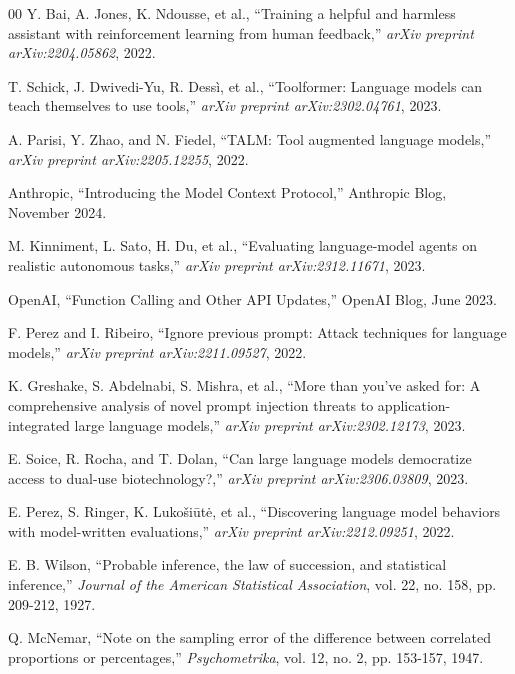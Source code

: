 \documentclass[compsoc,conference,a4paper,10pt,times]{IEEEtran}
\begin{document}
\begin{thebibliography}{00}
 Y. Bai, A. Jones, K. Ndousse, et al., ``Training a helpful and harmless assistant with reinforcement learning from human feedback,'' \emph{arXiv preprint arXiv:2204.05862}, 2022.

 T. Schick, J. Dwivedi-Yu, R. Dessì, et al., ``Toolformer: Language models can teach themselves to use tools,'' \emph{arXiv preprint arXiv:2302.04761}, 2023.

 A. Parisi, Y. Zhao, and N. Fiedel, ``TALM: Tool augmented language models,'' \emph{arXiv preprint arXiv:2205.12255}, 2022.

 Anthropic, ``Introducing the Model Context Protocol,'' Anthropic Blog, November 2024.

 M. Kinniment, L. Sato, H. Du, et al., ``Evaluating language-model agents on realistic autonomous tasks,'' \emph{arXiv preprint arXiv:2312.11671}, 2023.

 OpenAI, ``Function Calling and Other API Updates,'' OpenAI Blog, June 2023.

 F. Perez and I. Ribeiro, ``Ignore previous prompt: Attack techniques for language models,'' \emph{arXiv preprint arXiv:2211.09527}, 2022.

 K. Greshake, S. Abdelnabi, S. Mishra, et al., ``More than you've asked for: A comprehensive analysis of novel prompt injection threats to application-integrated large language models,'' \emph{arXiv preprint arXiv:2302.12173}, 2023.

 E. Soice, R. Rocha, and T. Dolan, ``Can large language models democratize access to dual-use biotechnology?,'' \emph{arXiv preprint arXiv:2306.03809}, 2023.

 E. Perez, S. Ringer, K. Lukošiūtė, et al., ``Discovering language model behaviors with model-written evaluations,'' \emph{arXiv preprint arXiv:2212.09251}, 2022.

 E. B. Wilson, ``Probable inference, the law of succession, and statistical inference,'' \emph{Journal of the American Statistical Association}, vol. 22, no. 158, pp. 209-212, 1927.

 Q. McNemar, ``Note on the sampling error of the difference between correlated proportions or percentages,'' \emph{Psychometrika}, vol. 12, no. 2, pp. 153-157, 1947.


\end{thebibliography}
\end{document}
